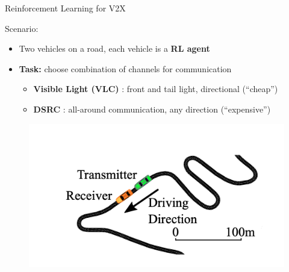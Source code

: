 \documentclass[aspectratio=169,12pt]{beamer}
\begin{document}
\begin{frame}[fragile]{Reinforcement Learning for V2X}
  \vspace{-1em}

  Scenario:

  \vspace{-0.5em}
  
  \begin{itemize}
  \item Two vehicles on a road, each vehicle is a \textbf{RL agent}  
  \item \textbf{Task:} choose combination of channels for communication
    \begin{itemize}
    \item \textcolor{beamer@blendedblue}{ \bfseries Visible Light (VLC) }: front and tail light, directional (``cheap'')
    \item \textcolor{beamer@blendedblue}{ \bfseries DSRC }: all-around communication, any direction (``expensive'')
    \end{itemize}
  \end{itemize}

  \vspace{-1em}

        
  \begin{figure}
    \centering
    \includegraphics[scale=0.3]{images/vehicles.png}
  \end{figure}

  
  \vspace{1em}

\end{frame}
\end{document}
